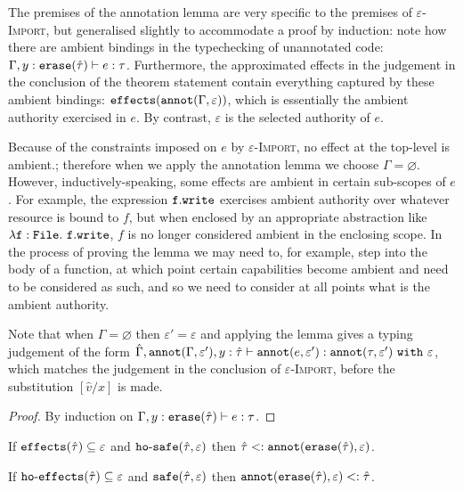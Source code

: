 The premises of the annotation lemma are very specific to the premises of \textsc{$\varepsilon$-Import}, but generalised slightly to accommodate a proof by induction: note how there are ambient bindings in the typechecking of unannotated code: $\Gamma, y: \mathtt{erase}(\hat \tau) \vdash e: \tau$. Furthermore, the approximated effects in the judgement in the conclusion of the theorem statement contain everything captured by these ambient bindings: $\mathtt{effects}(\mathtt{annot}(\Gamma, \varepsilon))$, which is essentially the ambient authority exercised in $e$. By contrast, $\varepsilon$ is the selected authority of $e$.

Because of the constraints imposed on $e$ by \textsc{$\varepsilon$-Import}, no effect at the top-level is ambient.; therefore when we apply the annotation lemma we choose $\Gamma = \varnothing$. However, inductively-speaking, some effects are ambient in certain sub-scopes of $e$. For example, the expression $\mathtt{f.write}$ exercises ambient authority over whatever resource is bound to $f$, but when enclosed by an appropriate abstraction like $\mathtt{\lambda f: {File}.~f.write}$, $f$ is no longer considered ambient in the enclosing scope. In the process of proving the lemma we may need to, for example, step into the body of a function, at which point certain capabilities become ambient and need to be considered as such, and so we need to consider at all points what is the ambient authority.

Note that when $\Gamma = \varnothing$ then $\varepsilon' = \varepsilon$ and applying the lemma gives a typing judgement of the form $\hat \Gamma, \mathtt{annot}(\Gamma, \varepsilon'), y: \hat \tau \vdash \mathtt{annot}(e, \varepsilon') : \mathtt{annot}(\tau, \varepsilon')~\mathtt{with}~ \varepsilon$, which matches the judgement in the conclusion of \textsc{$\varepsilon$-Import}, before the substitution $[\hat v/x]$ is made.

\begin{proof}
By induction on $\Gamma, y: \mathtt{erase}(\hat \tau) \vdash e: \tau$.
\end{proof}

\begin{lemma}
If $\mathtt{effects}(\hat \tau) \subseteq \varepsilon$ and $\mathtt{ho \hbox{-} safe}(\hat \tau, \varepsilon)$ then $\hat \tau <: \mathtt{annot}(\mathtt{erase}(\hat \tau), \varepsilon)$.
\end{lemma}

\begin{lemma}
If $\mathtt{ho \hbox{-} effects}(\hat \tau) \subseteq \varepsilon$ and $\mathtt{safe}(\hat \tau, \varepsilon)$ then $\mathtt{annot(erase}(\hat \tau), \varepsilon) <: \hat \tau$.
\end{lemma}

